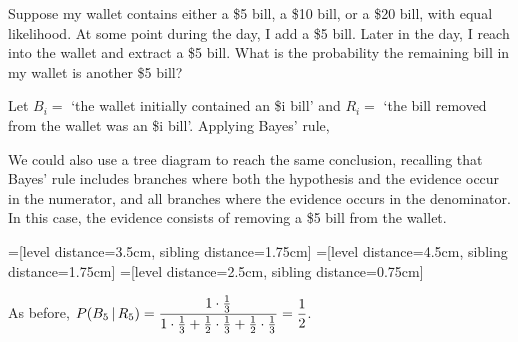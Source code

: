 \begin{examp}
Suppose my wallet contains either a \$5 bill, a \$10 bill, or a \$20 bill, with equal likelihood. At some point during the day, I add a \$5 bill. Later in the day, I reach into the wallet and extract a \$5 bill. What is the probability the remaining bill in my wallet is another \$5 bill?
\par
\noindent Let $B_i =$ `the wallet initially contained an \$i bill' and $R_i =$ `the bill removed from the wallet was an \$i bill'. Applying Bayes' rule,
\par
\noindent We could also use a tree diagram to reach the same conclusion, recalling that Bayes' rule includes branches where both the hypothesis and the evidence occur in the numerator, and all branches where the evidence occurs in the denominator. In this case, the evidence consists of removing a \$5 bill from the wallet.
\begin{center}
=[level distance=3.5cm, sibling distance=1.75cm]
=[level distance=4.5cm, sibling distance=1.75cm]
=[level distance=2.5cm, sibling distance=0.75cm]
\end{center}
As before, $P(B_5 \,|\, R_5) = \displaystyle\frac{1 \cdot \frac{1}{3}}{1 \cdot \frac{1}{3} + \frac{1}{2} \cdot \frac{1}{3} + \frac{1}{2} \cdot \frac{1}{3}} = \frac{1}{2}$.
\end{examp}


